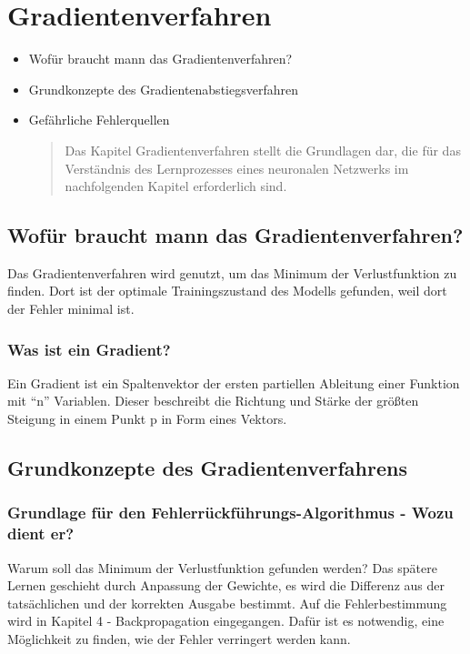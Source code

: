 \newpage
\thispagestyle{empty}
\section{Gradientenverfahren}\label{sec:gradientenverfahren}   
\begin{tcolorbox}[title={Inhalte des \textit{Gradientenverfahren}}]
  \begin{itemize}
    \item Wofür braucht mann das Gradientenverfahren?
    \item Grundkonzepte des Gradientenabstiegsverfahren
    \item Gefährliche Fehlerquellen
  \begin{quotation}\noindent
      Das Kapitel Gradientenverfahren stellt die Grundlagen dar, die für das Verständnis des Lernprozesses eines neuronalen Netzwerks im nachfolgenden Kapitel erforderlich sind.
  \end{quotation}
  \end{itemize}
\end{tcolorbox}


\subsection{Wofür braucht mann das Gradientenverfahren?}\label{subsec:gradientenverfahren:wofuer}
Das Gradientenverfahren wird genutzt, um das Minimum der Verlustfunktion zu finden. Dort ist der optimale Trainingszustand des Modells gefunden, weil dort der Fehler minimal ist.


\subsubsection{Was ist ein Gradient?}\label{subsec:gradientenverfahren:was_ist_gradient}
  Ein Gradient ist ein Spaltenvektor der ersten partiellen Ableitung einer Funktion mit “n” Variablen.
  Dieser beschreibt die Richtung und Stärke der größten Steigung in einem Punkt p in Form eines Vektors.\cite{JH20}


\subsection{Grundkonzepte des Gradientenverfahrens}\label{subsec:gradientenverfahren:grundkonzepte}
\subsubsection{Grundlage für den Fehlerrückführungs-Algorithmus - Wozu dient er?}\label{subsec:gradientenverfahren:grundlage_fehlerrueckfuehrungsalg}
  Warum soll das Minimum der Verlustfunktion gefunden werden? Das spätere Lernen geschieht durch Anpassung der Gewichte, es wird die Differenz aus der tatsächlichen und der korrekten Ausgabe bestimmt. 
  Auf die Fehlerbestimmung wird in Kapitel 4 - Backpropagation eingegangen. Dafür ist es notwendig, eine Möglichkeit zu finden, wie der Fehler verringert werden kann.

